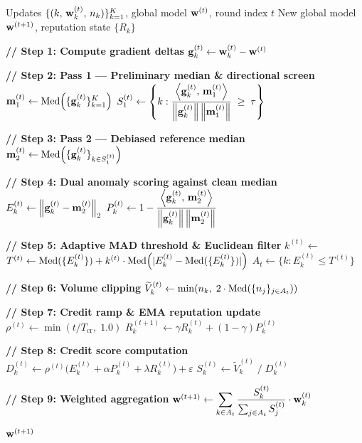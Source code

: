 \documentclass[../main.tex]{subfiles}
\begin{document}
\begin{algorithm}[htbp]
\caption{\aegis{} Aggregation — Round $t$}
\label{alg:aegis}
\begin{algorithmic}[1]
\Require Updates $\{(k,\, \mathbf{w}_k^{(t)},\, n_k)\}_{k=1}^{K}$, global model $\mathbf{w}^{(t)}$, round index $t$
\Ensure New global model $\mathbf{w}^{(t+1)}$, reputation state $\{R_k\}$

\State \textbf{// Step 1: Compute gradient deltas}
    \State $\mathbf{g}_{k}^{(t)} \gets \mathbf{w}_k^{(t)} - \mathbf{w}^{(t)}$
\EndFor

\State \textbf{// Step 2: Pass 1 — Preliminary median \& directional screen}
\State $\mathbf{m}_{1}^{(t)} \gets \operatorname{Med}\!\left(\{\mathbf{g}_{k}^{(t)}\}_{k=1}^{K}\right)$ 
\State $S_1^{(t)} \gets \left\{k : \dfrac{\left\langle \mathbf{g}_{k}^{(t)},\, \mathbf{m}_{1}^{(t)} \right\rangle}{\left\lVert \mathbf{g}_{k}^{(t)} \right\rVert\left\lVert \mathbf{m}_{1}^{(t)} \right\rVert} \;\geq\; \tau\right\}$

\State \textbf{// Step 3: Pass 2 — Debiased reference median}
\State $\mathbf{m}_{2}^{(t)} \gets \operatorname{Med}\!\left(\{\mathbf{g}_{k}^{(t)}\}_{k \in S_1^{(t)}}\right)$ 

\State \textbf{// Step 4: Dual anomaly scoring against clean median}
    \State $E_k^{(t)} \gets \left\lVert \mathbf{g}_{k}^{(t)} - \mathbf{m}_{2}^{(t)} \right\rVert_2$
    \State $P_k^{(t)} \gets 1 - \dfrac{\left\langle \mathbf{g}_{k}^{(t)},\, \mathbf{m}_{2}^{(t)} \right\rangle}{\left\lVert \mathbf{g}_{k}^{(t)} \right\rVert\left\lVert \mathbf{m}_{2}^{(t)} \right\rVert}$
\EndFor

\State \textbf{// Step 5: Adaptive MAD threshold \& Euclidean filter}
\State $k^{(t)} \gets$  
\State $T^{(t)} \gets \operatorname{Med}(\{E_k^{(t)}\}) + k^{(t)} \cdot \operatorname{Med}\!\left(|E_k^{(t)} - \operatorname{Med}(\{E_k^{(t)}\})|\right)$
\State $A_t \gets \{k : E_k^{(t)} \leq T^{(t)}\}$ 

\State \textbf{// Step 6: Volume clipping}
    \State $\widetilde{V}_k^{(t)} \gets \min\!\left(n_k,\; 2 \cdot \operatorname{Med}\!\left(\{n_j\}_{j \in A_t}\right)\right)$
\EndFor

\State \textbf{// Step 7: Credit ramp \& EMA reputation update}
\State $\rho^{(t)} \gets \min(t / T_{\text{cr}},\; 1.0)$ 
    \State $R_k^{(t+1)} \gets \gamma R_k^{(t)} + (1 - \gamma) P_k^{(t)}$  
\EndFor

\State \textbf{// Step 8: Credit score computation}
    \State $D_k^{(t)} \gets \rho^{(t)} \bigl(E_k^{(t)} + \alpha P_k^{(t)} + \lambda R_k^{(t)}\bigr) + \varepsilon$
    \State $S_k^{(t)} \gets \widetilde{V}_k^{(t)} \;/\; D_k^{(t)}$
\EndFor

\State \textbf{// Step 9: Weighted aggregation}
\State $\mathbf{w}^{(t+1)} \gets \displaystyle\sum_{k \in A_t} \frac{S_k^{(t)}}{\sum_{j \in A_t} S_j^{(t)}} \cdot \mathbf{w}_k^{(t)}$

\State \Return $\mathbf{w}^{(t+1)}$
\end{algorithmic}
\end{algorithm}
\end{document}
